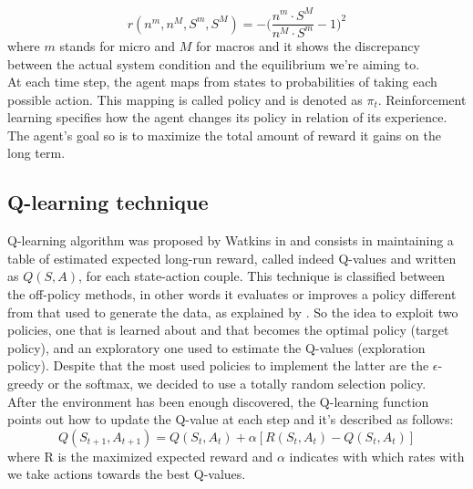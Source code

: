 \documentclass[conference,10pt]{IEEEtran}
\begin{document}
\begin{equation*}
r(n^{m},n^{M},S^{m},S^{M})=-\bigg( \frac{n^{m}\cdot S^{M}}{n^{M} \cdot S^{m}}-1 \bigg) ^2
\end{equation*} 
where $m$ stands for micro and $M$ for macros and it shows the discrepancy between the actual system condition and the equilibrium we're aiming to. \\
At each time step, the agent maps from states to probabilities of taking each possible action. This mapping is called policy and is denoted as $\pi_t$. Reinforcement
learning specifies how the agent changes its policy in relation of its experience. The agent’s goal so is to maximize the total amount of reward it gains on the long term.
\subsection{Q-learning technique}
Q-learning algorithm was proposed by Watkins in \cite{watkins1992q} and consists in maintaining a table of estimated expected long-run reward, called indeed Q-values and written as $Q(S,A)  $, for each state-action couple. This technique is classified between the off-policy methods, in other words it evaluates or improves a policy different from that used to generate the data, as explained by \cite{sutton1998reinforcement}. So the idea to exploit two policies, one that is learned about and that becomes the optimal policy (target policy), and an exploratory one used to estimate the Q-values (exploration policy). Despite that the most used policies to implement the latter are the $\epsilon$-greedy or the softmax, we decided to use a totally random selection policy. \\
After the environment has been enough discovered, the Q-learning function points out how to update the Q-value at each step and it's described as follows:
\begin{equation*}
Q(S_{t+1},A_{t+1})=Q(S_{t},A_{t})+\alpha[R(S_{t},A_{t})-Q(S_{t},A_{t})]
\end{equation*}
where R is the maximized expected reward and $\alpha$ indicates with which rates with we take actions towards the best Q-values.
\end{document}
